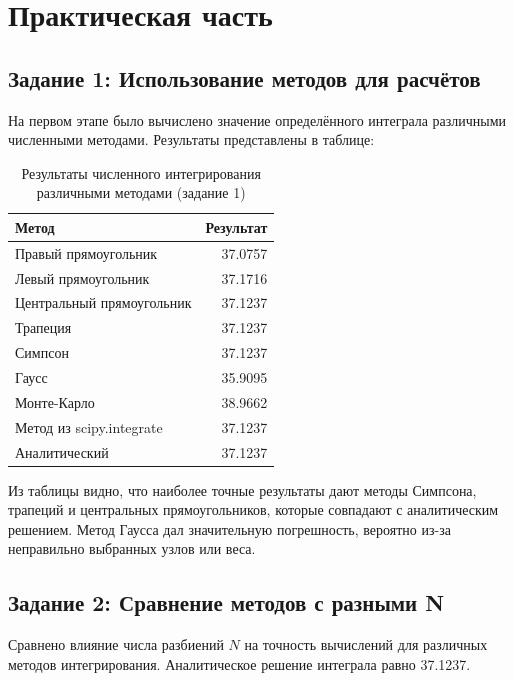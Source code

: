 \documentclass[a4paper]{article}
\begin{document}
\section*{\centering\fontsize{14pt}{0pt}\selectfont\textbf{Практическая часть}\label{sec:practice}}

\subsection*{Задание 1: Использование методов для расчётов}

На первом этапе было вычислено значение определённого интеграла различными численными методами. Результаты представлены в таблице:

\begin{table}[H]
\centering
\begin{tabular}{lr}
\hline
Метод & Результат \\
\hline
Правый прямоугольник & 37.0757 \\
Левый прямоугольник & 37.1716 \\
Центральный прямоугольник & 37.1237 \\
Трапеция & 37.1237 \\
Симпсон & 37.1237 \\
Гаусс & 35.9095 \\
Монте-Карло & 38.9662 \\
Метод из scipy.integrate & 37.1237 \\
Аналитический & 37.1237 \\
\hline
\end{tabular}
\caption{Результаты численного интегрирования различными методами (задание 1)}
\end{table}

Из таблицы видно, что наиболее точные результаты дают методы Симпсона, трапеций и центральных прямоугольников, которые совпадают с аналитическим решением. Метод Гаусса дал значительную погрешность, вероятно из-за неправильно выбранных узлов или веса.

\subsection*{Задание 2: Сравнение методов с разными N}

Сравнено влияние числа разбиений $N$ на точность вычислений для различных методов интегрирования. Аналитическое решение интеграла равно 37.1237.
\end{document}
